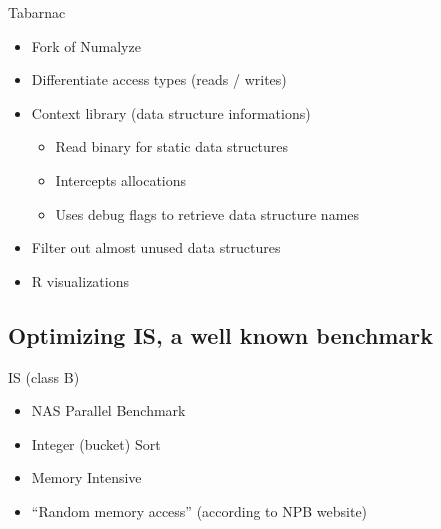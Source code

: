 \documentclass[xcolor={usenames,dvipsnames},hyperref={pdfusetitle}]{beamer}
\begin{document}
\begin{frame}{Tabarnac}
    \begin{exampleblock}{}
        \begin{itemize}
            \item Fork of Numalyze
            \item Differentiate access types (reads / writes)
            \item Context library (data structure informations)
                \begin{itemize}
                    \item Read binary for static data structures
                    \item Intercepts allocations
                    \item Uses debug flags to retrieve data structure names
                \end{itemize}
            \item Filter out almost unused data structures
            \item R visualizations
        \end{itemize}
    \end{exampleblock}
\end{frame}

\subsection{Optimizing IS, a well known benchmark}

\begin{frame}{IS (class B)}
    \begin{block}{}
        \begin{itemize}
            \item NAS Parallel Benchmark~\cite{Jin99NPBOpenMP}
            \item Integer (bucket) Sort
            \item Memory Intensive
            \item<alert@1-> “Random memory access” (according to NPB website)
        \end{itemize}
    \end{block}
\end{frame}
\end{document}
